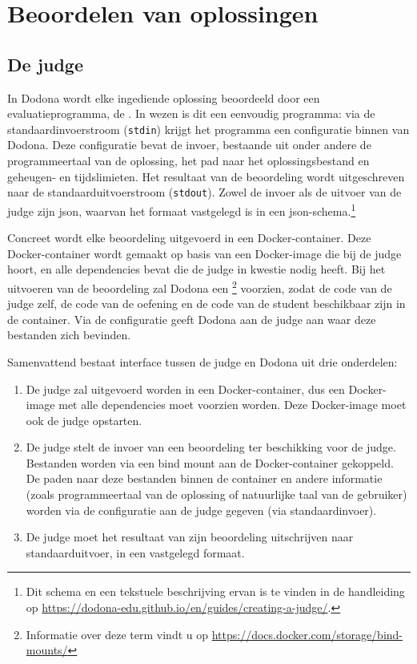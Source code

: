 \section{Beoordelen van oplossingen}\label{sec:evalueren-van-een-oplossing}

\subsection{De judge}\label{subsec:de-judge}

In Dodona wordt elke ingediende oplossing beoordeeld door een evaluatieprogramma, de .
In wezen is dit een eenvoudig programma: via de standaardinvoerstroom (\texttt{stdin}) krijgt het programma een configuratie binnen van Dodona.
Deze configuratie bevat de invoer, bestaande uit onder andere de programmeertaal van de oplossing, het pad naar het oplossingsbestand en geheugen- en tijdslimieten.
Het resultaat van de beoordeling wordt uitgeschreven naar de standaarduitvoerstroom (\texttt{stdout}).
Zowel de invoer als de uitvoer van de judge zijn json, waarvan het formaat vastgelegd is in een json-schema.\footnote{Dit schema en een tekstuele beschrijving ervan is te vinden in de handleiding op \url{https://dodona-edu.github.io/en/guides/creating-a-judge/}.}

Concreet wordt elke beoordeling uitgevoerd in een Docker-container.
Deze Docker-container wordt gemaakt op basis van een Docker-image die bij de judge hoort, en alle dependencies bevat die de judge in kwestie nodig heeft.
Bij het uitvoeren van de beoordeling zal Dodona een \footnote{Informatie over deze term vindt u op \url{https://docs.docker.com/storage/bind-mounts/}} voorzien, zodat de code van de judge zelf, de code van de oefening en de code van de student beschikbaar zijn in de container.
Via de configuratie geeft Dodona aan de judge aan waar deze bestanden zich bevinden.

Samenvattend bestaat interface tussen de judge en Dodona uit drie onderdelen:

\begin{enumerate}
    \item De judge zal uitgevoerd worden in een Docker-container, dus een Docker-image met alle dependencies moet voorzien worden.
    Deze Docker-image moet ook de judge opstarten.
    \item De judge stelt de invoer van een beoordeling ter beschikking voor de judge.
    Bestanden worden via een bind mount aan de Docker-container gekoppeld.
    De paden naar deze bestanden binnen de container en andere informatie (zoals programmeertaal van de oplossing of natuurlijke taal van de gebruiker) worden via de configuratie aan de judge gegeven (via standaardinvoer).
    \item De judge moet het resultaat van zijn beoordeling uitschrijven naar standaarduitvoer, in een vastgelegd formaat.
\end{enumerate}

